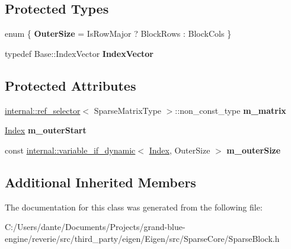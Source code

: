 \subsection*{Protected Types}
\begin{DoxyCompactItemize}
\item 
\mbox{\label{class_eigen_1_1internal_1_1sparse__matrix__block__impl_a4d27c9e1ecb083e8b286a97ea82f5d8a}} 
enum \{ {\bfseries Outer\+Size} = Is\+Row\+Major ? Block\+Rows \+: Block\+Cols
 \}
\item 
\mbox{\label{class_eigen_1_1internal_1_1sparse__matrix__block__impl_aa336897cd666b1c976550a1b72258b0c}} 
typedef Base\+::\+Index\+Vector {\bfseries Index\+Vector}
\end{DoxyCompactItemize}
\subsection*{Protected Attributes}
\begin{DoxyCompactItemize}
\item 
\mbox{\label{class_eigen_1_1internal_1_1sparse__matrix__block__impl_a42911d89cfd0ffb8df755ad5c831f3c4}} 
\mbox{\hyperlink{struct_eigen_1_1internal_1_1ref__selector}{internal\+::ref\+\_\+selector}}$<$ Sparse\+Matrix\+Type $>$\+::non\+\_\+const\+\_\+type {\bfseries m\+\_\+matrix}
\item 
\mbox{\label{class_eigen_1_1internal_1_1sparse__matrix__block__impl_ae40d81f5f65429e5dfff1cbaf7aa99bc}} 
\mbox{\hyperlink{struct_eigen_1_1_eigen_base_a554f30542cc2316add4b1ea0a492ff02}{Index}} {\bfseries m\+\_\+outer\+Start}
\item 
\mbox{\label{class_eigen_1_1internal_1_1sparse__matrix__block__impl_a937446f6277a7e32f839cc9da640e940}} 
const \mbox{\hyperlink{class_eigen_1_1internal_1_1variable__if__dynamic}{internal\+::variable\+\_\+if\+\_\+dynamic}}$<$ \mbox{\hyperlink{struct_eigen_1_1_eigen_base_a554f30542cc2316add4b1ea0a492ff02}{Index}}, Outer\+Size $>$ {\bfseries m\+\_\+outer\+Size}
\end{DoxyCompactItemize}
\subsection*{Additional Inherited Members}


The documentation for this class was generated from the following file\+:\begin{DoxyCompactItemize}
\item 
C\+:/\+Users/dante/\+Documents/\+Projects/grand-\/blue-\/engine/reverie/src/third\+\_\+party/eigen/\+Eigen/src/\+Sparse\+Core/Sparse\+Block.\+h\end{DoxyCompactItemize}
